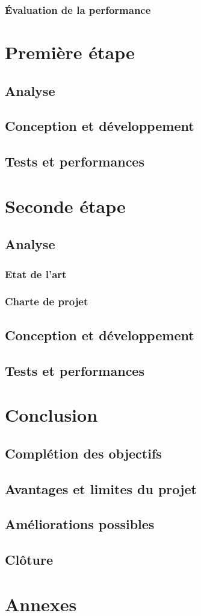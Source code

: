 \documentclass[a4paper, 12pt]{report}
\begin{document}
        \subsection{Évaluation de la performance}
    

\chapter{Première étape}
\minitoc
{}
\clearpage
    \section{Analyse}
    \section{Conception et développement}
    \section{Tests et performances}


\chapter{Seconde étape}
\minitoc
{}
\clearpage
    \section{Analyse}
        \subsection{Etat de l'art}
        \subsection{Charte de projet}
    \section{Conception et développement}
    \section{Tests et performances}

\chapter{Conclusion}
\minitoc
{}
\clearpage
    \section{Complétion des objectifs}
    \section{Avantages et limites du projet}
    \section{Améliorations possibles}
    \section{Clôture}

\chapter{Annexes}
\minitoc
{}
\clearpage            

\appendix
\end{document}

